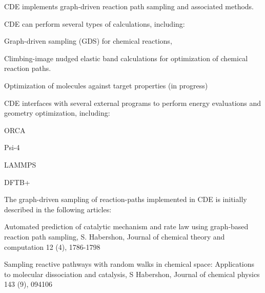 C\+DE implements graph-\/driven reaction path sampling and associated methods.

C\+DE can perform several types of calculations, including\+:
\begin{DoxyItemize}
\item Graph-\/driven sampling (G\+DS) for chemical reactions,
\item Climbing-\/image nudged elastic band calculations for optimization of chemical reaction paths.
\item Optimization of molecules against target properties (in progress)
\end{DoxyItemize}

C\+DE interfaces with several external programs to perform energy evaluations and geometry optimization, including\+:
\begin{DoxyItemize}
\item O\+R\+CA
\item Psi-\/4
\item L\+A\+M\+M\+PS
\item D\+F\+T\+B+
\end{DoxyItemize}

The graph-\/driven sampling of reaction-\/paths implemented in C\+DE is initially described in the following articles\+:
\begin{DoxyItemize}
\item Automated prediction of catalytic mechanism and rate law using graph-\/based reaction path sampling, S. Habershon, Journal of chemical theory and computation 12 (4), 1786-\/1798
\end{DoxyItemize}

Sampling reactive pathways with random walks in chemical space\+: Applications to molecular dissociation and catalysis, S Habershon, Journal of chemical physics 143 (9), 094106 